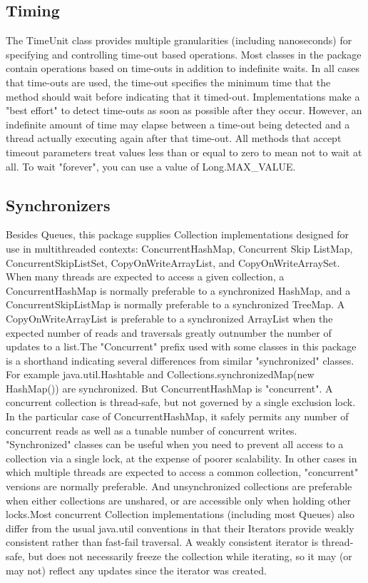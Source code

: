 \documentclass[12pt,a4paper]{report}%
\begin{document}
\subsection{Timing}
The TimeUnit class provides multiple granularities (including nanoseconds) for specifying and controlling time-out based operations. Most classes in the package contain operations based on time-outs in addition to indefinite waits. In all cases that time-outs are used, the time-out specifies the minimum time that the method should wait before indicating that it timed-out. Implementations make a "best effort" to detect time-outs as soon as possible after they occur. However, an indefinite amount of time may elapse between a time-out being detected and a thread actually executing again after that time-out. All methods that accept timeout parameters treat values less than or equal to zero to mean not to wait at all. To wait "forever", you can use a value of Long.MAX_VALUE.


\subsection{Synchronizers}

Besides Queues, this package supplies Collection implementations designed for use in multithreaded contexts: ConcurrentHashMap, Concurrent Skip ListMap, ConcurrentSkipListSet, CopyOnWriteArrayList, and CopyOnWriteArraySet. When many threads are expected to access a given collection, a ConcurrentHashMap is normally preferable to a synchronized HashMap, and a ConcurrentSkipListMap is normally preferable to a synchronized TreeMap. A CopyOnWriteArrayList is preferable to a synchronized ArrayList when the expected number of reads and traversals greatly outnumber the number of updates to a list.The "Concurrent" prefix used with some classes in this package is a shorthand indicating several differences from similar "synchronized" classes. For example java.util.Hashtable and Collections.synchronizedMap(new HashMap()) are synchronized. But ConcurrentHashMap is "concurrent". A concurrent collection is thread-safe, but not governed by a single exclusion lock. In the particular case of ConcurrentHashMap, it safely permits any number of concurrent reads as well as a tunable number of concurrent writes. "Synchronized" classes can be useful when you need to prevent all access to a collection via a single lock, at the expense of poorer scalability. In other cases in which multiple threads are expected to access a common collection, "concurrent" versions are normally preferable. And unsynchronized collections are preferable when either collections are unshared, or are accessible only when holding other locks.Most concurrent Collection implementations (including most Queues) also differ from the usual java.util conventions in that their Iterators provide weakly consistent rather than fast-fail traversal. A weakly consistent iterator is thread-safe, but does not necessarily freeze the collection while iterating, so it may (or may not) reflect any updates since the iterator was created.
\end{document}
